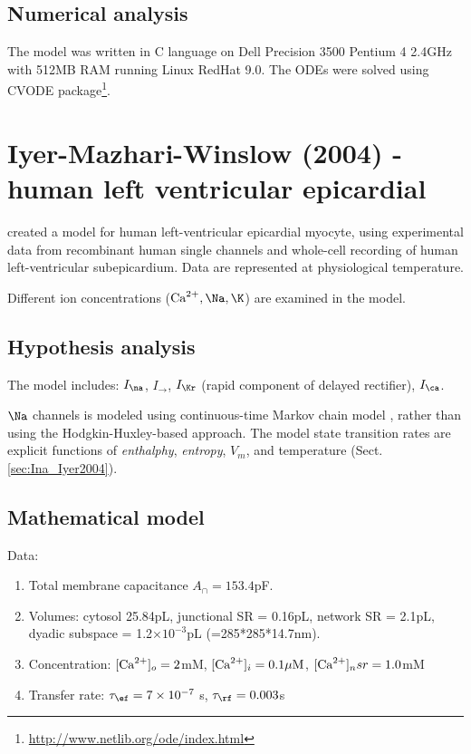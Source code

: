\subsection{Numerical analysis}

The model was written in C language on Dell Precision 3500 Pentium 4 2.4GHz with
512MB RAM running Linux RedHat 9.0.
The ODEs were solved using CVODE
package\footnote{\url{http://www.netlib.org/ode/index.html}}.


\section{Iyer-Mazhari-Winslow (2004) - human left ventricular epicardial}
\label{sec:Iyer-Winslow2004}

\citep{iyer2004} created a model for human left-ventricular epicardial myocyte,
using experimental data from recombinant human single channels and whole-cell
recording of human left-ventricular subepicardium. Data are represented at
physiological temperature.

Different ion concentrations ($\Ca, \Na, \K$) are examined in the model.

\subsection{Hypothesis analysis}

The model includes: $I_\na$, $I_{\to}$, $I_{\Kr}$ (rapid component of delayed
rectifier), $I_\ca$.

$\Na$ channels is modeled using continuous-time Markov chain model
\citep{irvine1999}, rather than using the Hodgkin-Huxley-based approach. The
model state transition rates are explicit functions of {\it enthalphy}, {\it
entropy}, $V_m$, and temperature (Sect.\ref{sec:Ina_Iyer2004}).



\subsection{Mathematical model}

Data:
\begin{enumerate}
  \item  Total membrane capacitance $A_\cap=153.4$pF.

  \item Volumes: cytosol 25.84pL,
junctional SR = 0.16pL, network SR = 2.1pL, dyadic subspace = 1.2$\times
10^{-3}$pL (=285*285*14.7nm).

  \item Concentration: $[{\text{Ca}^{2+}}]_o=2$mM, $[{\text{Ca}^{2+}}]_i=0.1{\mu\text{M}}$, $[{\text{Ca}^{2+}}]_nsr=1.0$mM
  \item Transfer rate: $\tau_\ef = 7\times 10^{-7}$ s,
  $\tau_\rf=0.003$s
\end{enumerate}


